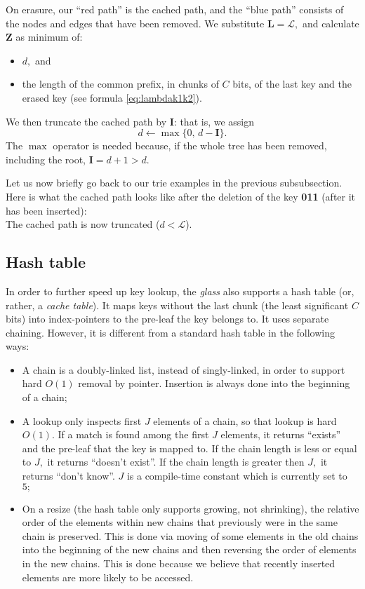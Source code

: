 \documentclass[a4paper,12pt]{article}
\begin{document}
On erasure, our ``red path'' is the cached path, and the ``blue path'' consists of the nodes and edges that have been removed.
We substitute $\mathbf{L} = \mathcal{L},$ and calculate $\mathbf{Z}$ as minimum of:
\begin{itemize}
    \item $d,$ and
    \item the length of the common prefix, in chunks of $C$ bits, of the last key and the erased key (see formula \ref{eq:lambdak1k2}).
\end{itemize}
We then truncate the cached path by $\mathbf{I}$: that is, we assign $$d \longleftarrow \max \{ 0, \, d - \mathbf{I} \}.$$
The $\max$ operator is needed because, if the whole tree has been removed, including the root, $\mathbf{I} = d + 1 > d.$

Let us now briefly go back to our trie examples in the previous subsubsection.
Here is what the cached path looks like after the deletion of the key \textbf{011} (after it has been inserted):\\


The cached path is now truncated ($d < \mathcal{L}$).

\subsection{Hash table}

In order to further speed up key lookup, the \textit{glass} also supports a hash table (or, rather, a \textit{cache table}).
It maps keys without the last chunk (the least significant $C$ bits) into index-pointers to the pre-leaf the key belongs to.
It uses separate chaining. However, it is different from a standard hash table in the following ways:
\begin{itemize}
    \item A chain is a doubly-linked list, instead of singly-linked, in order to support hard $O(1)$ removal by pointer.
        Insertion is always done into the beginning of a chain;
    \item A lookup only inspects first $J$ elements of a chain, so that lookup is hard $O(1).$
        If a match is found among the first $J$ elements, it returns ``exists'' and the pre-leaf that the key is mapped to.
        If the chain length is less or equal to $J,$ it returns ``doesn't exist''.
        If the chain length is greater then $J,$ it returns ``don't know''.
        $J$ is a compile-time constant which is currently set to $5;$
    \item On a resize (the hash table only supports growing, not shrinking),
        the relative order of the elements within new chains that previously were in the same chain
        is preserved.
        This is done via moving of some elements in the old chains into the beginning of the new chains and
        then reversing the order of elements in the new chains.
        This is done because we believe that recently inserted elements are more likely to be accessed.
\end{itemize}
\end{document}

